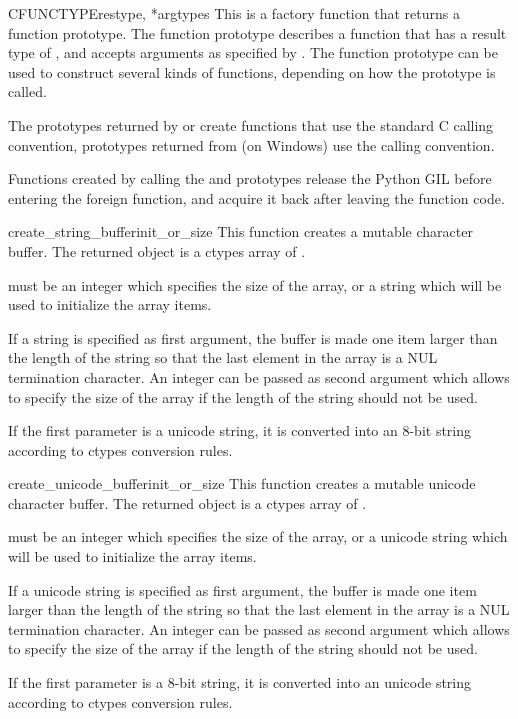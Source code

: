 \begin{funcdesc}{CFUNCTYPE}{restype, *argtypes}
This is a factory function that returns a function prototype.  The
function prototype describes a function that has a result type of
, and accepts arguments as specified by .
The function prototype can be used to construct several kinds of
functions, depending on how the prototype is called.

The prototypes returned by  or 
create functions that use the standard C calling convention,
prototypes returned from  (on Windows) use the
 calling convention.

Functions created by calling the  and
 prototypes release the Python GIL
before entering the foreign function, and acquire it back after
leaving the function code.


\end{funcdesc}

\begin{funcdesc}{create_string_buffer}{init_or_size}
This function creates a mutable character buffer.  The returned object
is a ctypes array of .

 must be an integer which specifies the size of the
array, or a string which will be used to initialize the array items.

If a string is specified as first argument, the buffer is made one
item larger than the length of the string so that the last element in
the array is a NUL termination character.  An integer can be passed as
second argument which allows to specify the size of the array if the
length of the string should not be used.

If the first parameter is a unicode string, it is converted into an
8-bit string according to ctypes conversion rules.
\end{funcdesc}

\begin{funcdesc}{create_unicode_buffer}{init_or_size}
This function creates a mutable unicode character buffer.  The
returned object is a ctypes array of .

 must be an integer which specifies the size of the
array, or a unicode string which will be used to initialize the array
items.

If a unicode string is specified as first argument, the buffer is made
one item larger than the length of the string so that the last element
in the array is a NUL termination character.  An integer can be passed
as second argument which allows to specify the size of the array if
the length of the string should not be used.

If the first parameter is a 8-bit string, it is converted into an
unicode string according to ctypes conversion rules.
\end{funcdesc}


